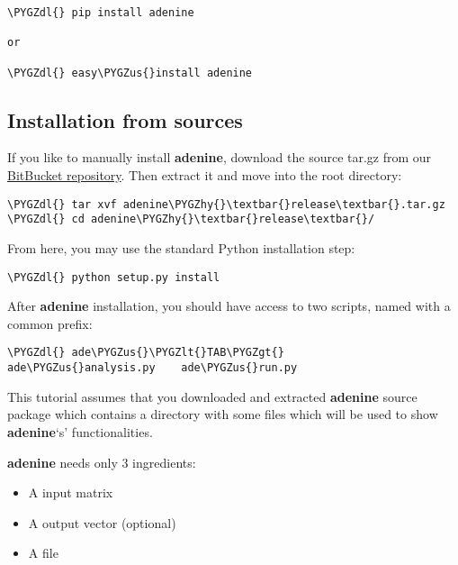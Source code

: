 \documentclass[letterpaper,10pt,english]{sphinxmanual}
\def\PYGZus{\char`\_}
\def\PYGZlt{\char`\<}
\def\PYGZgt{\char`\>}
\def\PYGZdl{\char`\$}
\def\PYGZhy{\char`\-}
\begin{document}
\begin{Verbatim}[commandchars=\\\{\}]
\PYGZdl{} pip install adenine

or

\PYGZdl{} easy\PYGZus{}install adenine
\end{Verbatim}


\subsection{Installation from sources}
\label{tutorial:installation-from-sources}
If you like to manually install \textbf{adenine}, download the source tar.gz
from our
\href{https://bitbucket.org/samuele\_fiorini/adenine}{BitBucket repository}.
Then extract it and move into the root directory:

\begin{Verbatim}[commandchars=\\\{\}]
\PYGZdl{} tar xvf adenine\PYGZhy{}\textbar{}release\textbar{}.tar.gz
\PYGZdl{} cd adenine\PYGZhy{}\textbar{}release\textbar{}/
\end{Verbatim}

From here, you may use the standard Python installation step:

\begin{Verbatim}[commandchars=\\\{\}]
\PYGZdl{} python setup.py install
\end{Verbatim}

After \textbf{adenine} installation, you should have access to two scripts,
named with a common  prefix:

\begin{Verbatim}[commandchars=\\\{\}]
\PYGZdl{} ade\PYGZus{}\PYGZlt{}TAB\PYGZgt{}
ade\PYGZus{}analysis.py    ade\PYGZus{}run.py
\end{Verbatim}

This tutorial assumes that you downloaded and extracted \textbf{adenine}
source package which contains a  directory with some  files
which will be used to show \textbf{adenine}`s' functionalities.

\textbf{adenine} needs only 3 ingredients:
\begin{itemize}
\item {} 
A  input matrix

\item {} 
A  output vector (optional)

\item {} 
A  file

\end{itemize}
\end{document}
